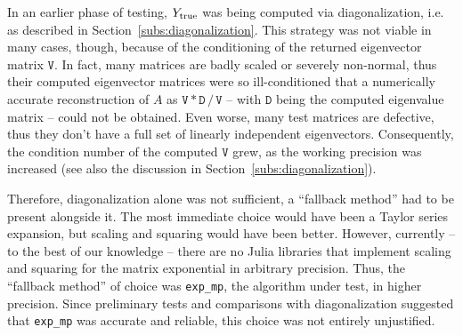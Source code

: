 In an earlier phase of testing, $Y_{\textup{true}}$ was being computed via diagonalization, i.e. as described in Section~\vref{subs:diagonalization}. 
This strategy was not viable in many cases, though, because of the conditioning of the returned eigenvector matrix $\mathtt{V}$. 
In fact, many matrices are badly scaled or severely non-normal, thus their computed eigenvector matrices were so ill-conditioned that a numerically accurate reconstruction of $A$ as $\mathtt{V}*\mathtt{D}\,/\,\mathtt{V}$ -- with $\mathtt{D}$ being the computed eigenvalue matrix --  could not be obtained. Even worse, many test matrices are defective, thus they don't have a full set of linearly independent eigenvectors. Consequently, the condition number of the computed $\mathtt{V}$ grew, as the working precision was increased (see also the discussion in Section~\ref{subs:diagonalization}).

Therefore, diagonalization alone was not sufficient, a ``fallback method'' had to be present alongside it. 
The most immediate choice would have been a Taylor series expansion, but scaling and squaring would have been better. However, currently -- to the best of our knowledge -- there are no Julia libraries that implement scaling and squaring for the matrix exponential in arbitrary precision. Thus, the ``fallback method'' of choice was \texttt{exp\_mp}, the algorithm under test, in higher precision. Since preliminary tests and comparisons with diagonalization suggested that \texttt{exp\_mp} was accurate and reliable, this choice was not entirely unjustified.

